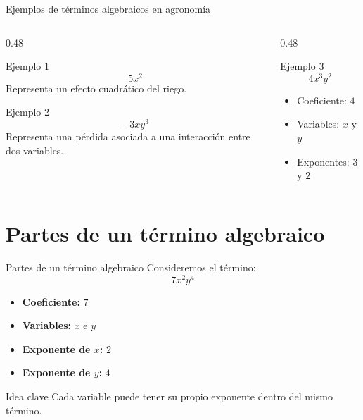 \documentclass[handout,aspectratio=169,12pt]{beamer}
\newcommand{\IdeaClave}[1]{
	\begin{alertblock}{Idea clave}
		#1
	\end{alertblock}
}
\begin{document}
	\begin{frame}{Ejemplos de términos algebraicos en agronomía}
		\begin{columns}[T]
			\begin{column}{0.48\textwidth}
				\begin{block}{Ejemplo 1}
					\[
					5x^2
					\]
					\pause
					Representa un efecto cuadrático del riego.
				\end{block}
				
				\pause
				\begin{block}{Ejemplo 2}
					\[
					-3xy^3
					\]
					\pause
					Representa una pérdida asociada a una interacción entre dos variables.
				\end{block}
			\end{column}
			
			\begin{column}{0.48\textwidth}
				\begin{exampleblock}{Ejemplo 3}
					\[
					4x^3y^2
					\]
					\pause
					\begin{itemize}
						\item Coeficiente: \(4\)
						\pause
						\item Variables: \(x\) y \(y\)
						\pause
						\item Exponentes: \(3\) y \(2\)
					\end{itemize}
				\end{exampleblock}
			\end{column}
		\end{columns}
	\end{frame}
	
	\section{Partes de un término algebraico}
	\begin{frame}{Partes de un término algebraico}
		Consideremos el término:
		\[
		7x^2y^4
		\]
		
		\pause
		\begin{itemize}
			\item \textbf{Coeficiente:} \(7\)
			\pause
			\item \textbf{Variables:} \(x\) e \(y\)
			\pause
			\item \textbf{Exponente de \(x\):} \(2\)
			\pause
			\item \textbf{Exponente de \(y\):} \(4\)
		\end{itemize}
		
		\pause
		\IdeaClave{Cada variable puede tener su propio exponente dentro del mismo término.}
	\end{frame}
	
\end{document}
